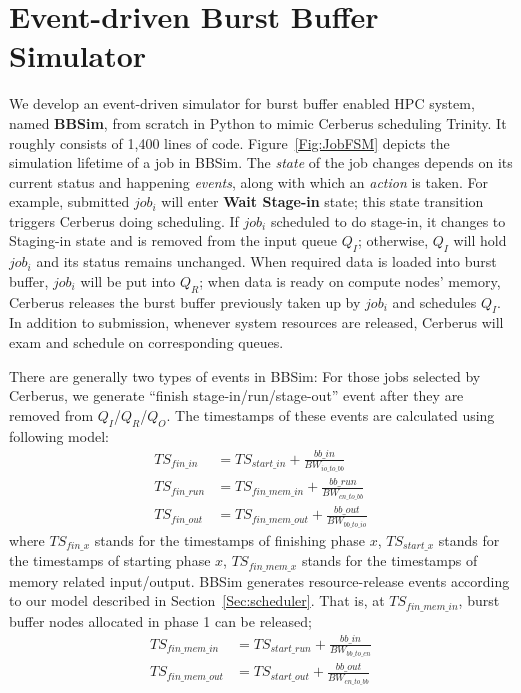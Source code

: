 \section{Event-driven Burst Buffer Simulator}

We develop an event-driven simulator for burst buffer enabled HPC system, named \textbf{BBSim},
from scratch in Python to mimic Cerberus scheduling Trinity.
It roughly consists of 1,400 lines of code.
Figure~\ref{Fig:JobFSM} depicts the simulation lifetime of a job in BBSim.
The \textit{state} of the job changes depends on its current status and
happening \textit{events}, along with which an \textit{action} is taken.
For example, submitted $job_i$ will enter \textbf{Wait Stage-in} state;
this state transition triggers Cerberus doing scheduling.
If $job_i$ scheduled to do stage-in, it changes to Staging-in state
and is removed from the input queue $Q_I$;
otherwise, $Q_I$ will hold $job_i$ and its status remains unchanged.
When required data is loaded into burst buffer, $job_i$ will be put into $Q_R$;
when data is ready on compute nodes' memory,
Cerberus releases the burst buffer previously taken up by $job_i$ and schedules $Q_I$.
In addition to submission, whenever system resources are released,
Cerberus will exam and schedule on corresponding queues.

There are generally two types of events in BBSim:
For those jobs selected by Cerberus,
we generate ``finish stage-in/run/stage-out'' event after
they are removed from $Q_I$/$Q_R$/$Q_O$.
The timestamps of these events are calculated using following model:
\begin{align}
        TS_{fin\_in} &= TS_{start\_in} + \frac{bb\_in}{BW_{io\_to\_bb}}\label{Equ:FinIn} \\
        TS_{fin\_run} &= TS_{fin\_mem\_in} + \frac{bb\_run}{BW_{cn\_to\_bb}}\label{Equ:FinRun} \\
        TS_{fin\_out} &= TS_{fin\_mem\_out} + \frac{bb\_out}{BW_{bb\_to\_io}} \label{Equ:FinOut}
\end{align}
where $TS_{fin\_x}$ stands for the timestamps of finishing phase $x$,
$TS_{start\_x}$ stands for the timestamps of starting phase $x$,
$TS_{fin\_mem\_x}$ stands for the timestamps of memory related input/output.
BBSim generates resource-release events
according to our model described in Section~\ref{Sec:scheduler}.
That is, at $TS_{fin\_mem\_in}$, burst buffer nodes allocated in phase 1 can be released;
\begin{align}
        TS_{fin\_mem\_in} &= TS_{start\_run} + \frac{bb\_in}{BW_{bb\_to\_cn}}\label{Equ:FinMemIn} \\
        TS_{fin\_mem\_out} &= TS_{start\_out} + \frac{bb\_out}{BW_{cn\_to\_bb}}\label{Equ:FinMemOut} \\
\end{align}

